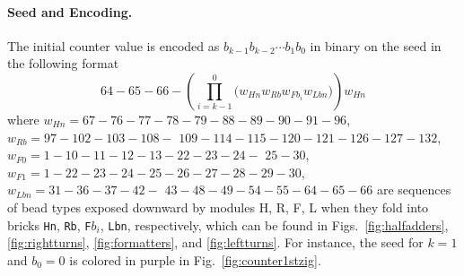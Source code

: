 \documentclass[runningheads]{llncs}
\begin{document}
\paragraph{Seed and Encoding.}
The initial counter value is encoded as $b_{k-1}b_{k-2} \cdots b_1b_0$ in binary on the seed in the following format
\begin{equation} \label{eq:zagencoding}
64{-}65{-}66{-}\left( \prod^0_{i = k-1} \bigl(  w_{Hn} w_{Rb} w_{Fb_i} w_{Lbn} \bigr) \right) w_{Hn}
\end{equation}
where $w_{Hn}= 67{-}76{-}77{-}78{-}79{-}88{-}89{-}90{-}91{-}96$, $w_{Rb}=97{-}102{-}103{-}108{-}$ $109{-}114{-}115{-}120{-}121{-}126{-}127{-}132$, $w_{F0} = 1{-}10{-}11{-}12{-}13{-}22{-}23{-}24{-}$ $25{-}30$, $w_{F1}=1{-}22{-}23{-}24{-}25{-}26{-}27{-}28{-}29{-}30$, $w_{Lbn}= 31{-}36{-}37{-}42{-}$ $43{-}48{-}49{-}54{-}55{-}64{-}65{-}66$ are sequences of bead types exposed downward by modules H, R, F, L when they fold into bricks \texttt{Hn}, \texttt{Rb}, \texttt{F}$b_i$, \texttt{Lbn}, respectively, which can be found in Figs.~\ref{fig:halfadders}, \ref{fig:rightturns}, \ref{fig:formatters}, and \ref{fig:leftturns}.
For instance, the seed for $k = 1$ and $b_0 = 0$ is colored in purple in Fig.~\ref{fig:counter1stzig}.
\end{document}

